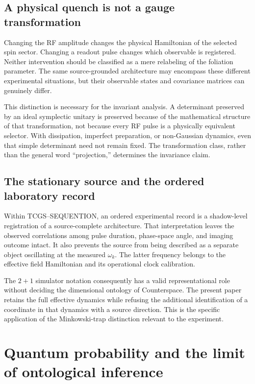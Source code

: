 \documentclass[11pt,a4paper]{article}
\theoremstyle{definition}
\theoremstyle{remark}
\newcommand{\TCGS}{TCGS--SEQUENTION}
\begin{document}
\subsection{A physical quench is not a gauge transformation}
Changing the RF amplitude changes the physical Hamiltonian of the selected spin sector. Changing a readout pulse changes which observable is registered. Neither intervention should be classified as a mere relabeling of the foliation parameter. The same source-grounded architecture may encompass these different experimental situations, but their observable states and covariance matrices can genuinely differ.\cite{zhang2026,foundation}

This distinction is necessary for the invariant analysis. A determinant preserved by an ideal symplectic unitary is preserved because of the mathematical structure of that transformation, not because every RF pulse is a physically equivalent selector. With dissipation, imperfect preparation, or non-Gaussian dynamics, even that simple determinant need not remain fixed. The transformation class, rather than the general word ``projection,'' determines the invariance claim.\cite{weedbrook,foundation}

\subsection{The stationary source and the ordered laboratory record}
Within \TCGS, an ordered experimental record is a shadow-level registration of a source-complete architecture. That interpretation leaves the observed correlations among pulse duration, phase-space angle, and imaging outcome intact. It also prevents the source from being described as a separate object oscillating at the measured $\omega_k$. The latter frequency belongs to the effective field Hamiltonian and its operational clock calibration.\cite{foundation,logical}

The $2+1$ simulator notation consequently has a valid representational role without deciding the dimensional ontology of Counterspace. The present paper retains the full effective dynamics while refusing the additional identification of a coordinate in that dynamics with a source direction. This is the specific application of the Minkowski-trap distinction relevant to the experiment.\cite{minkowski,foundation}

\section{Quantum probability and the limit of ontological inference}
\label{sec:probability}
\end{document}
